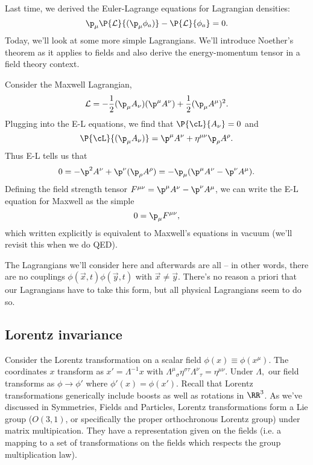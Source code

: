 Last time, we derived the Euler-Lagrange equations for Lagrangian densities:
\begin{equation}
\p_\mu \P{\mathcal{L}}{(\p_\mu \phi_a)}-\P{\mathcal{L}}{\phi_a}=0.
\end{equation}
Today, we'll look at some more simple Lagrangians. We'll introduce Noether's theorem as it applies to fields and also derive the energy-momentum tensor in a field theory context.

\begin{exm}
Consider the Maxwell Lagrangian,
\begin{equation}
\mathcal{L}=-\frac{1}{2}(\p_\mu A_\nu)(\p^\mu A^\nu)+\frac{1}{2}(\p_\mu A^\mu)^2.
\end{equation}
Plugging into the E-L equations, we find that $\P{\cL}{A_\nu}=0$ and
\begin{equation}
\P{\cL}{(\p_\mu A_\nu)}=\p^\mu A^\nu +\eta^{\mu\nu}\p_\rho A^\rho.
\end{equation}
Thus E-L tells us that
\begin{equation}
0=-\p^2 A^\nu+\p^\nu (\p_\rho A^\rho)=-\p_\mu(\p^\mu A^\nu-\p^\nu A^\mu).
\end{equation}
Defining the field strength tensor $F^{\mu\nu}=\p^\mu A^\nu-\p^\nu A^\mu$, we can write the E-L equation for Maxwell as the simple
$$0=\p_\mu F^{\mu\nu},$$
which written explicitly is equivalent to Maxwell's equations in vacuum (we'll revisit this when we do QED).
\end{exm}

The Lagrangians we'll consider here and afterwards are all -- in other words, there are no couplings $\phi(\vec{x},t)\phi(\vec{y},t)$ with $\vec{x}\neq \vec{y}$. There's no reason a priori that our Lagrangians have to take this form, but all physical Lagrangians seem to do so.

\subsection*{Lorentz invariance} Consider the Lorentz transformation on a scalar field $\phi(x)\equiv \phi (x^\mu)$. The coordinates $x$ transform as $x'=\Lambda^{-1} x$ with $\Lambda^\mu{}_\sigma \eta^{\sigma\tau}\Lambda^\nu{}_\tau = \eta^{\mu\nu}$. Under $\Lambda,$ our field transforms as $\phi\to \phi'$ where $\phi'(x)=\phi(x')$. Recall that Lorentz transformations generically include boosts as well as rotations in $\RR^3$. As we've discussed in Symmetries, Fields and Particles, Lorentz transformations form a Lie group ($O(3,1)$, or specifically the proper orthochronous Lorentz group) under matrix multipication. They have a representation given on the fields (i.e. a mapping to a set of transformations on the fields which respects the group multiplication law).

